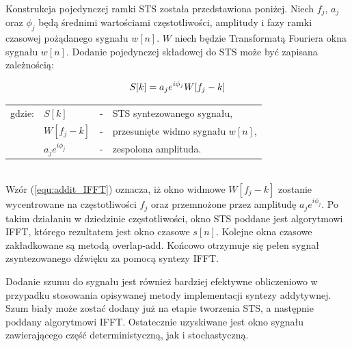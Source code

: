 Konstrukcja pojedynczej ramki STS została przedstawiona poniżej. Niech $f_{j}$, $a_{j}$ oraz $\phi_{j}$ będą średnimi wartościami częstotliwości, amplitudy i fazy ramki czasowej pożądanego sygnału $w[n]$. $W$ niech będzie Transformatą Fouriera okna sygnału $w[n]$. Dodanie pojedynczej składowej do STS może być zapisana zależnością:

\begin{equation} \label{equ:addit_IFFT}
S[k] = a_{j}e^{i\phi_{j}}W[f_{j} - k] \\  
\end{equation}
\begin{tabular}{ l l l l}
	gdzie: & $S[k]$ &  - & STS syntezowanego sygnału, \\
	& $W[f_{j} - k]$ &  - & przesunięte widmo sygnału $w[n]$, \\
	& $a_{j}e^{i\phi_{j}}$ & - & zespolona amplituda. \\
\end{tabular} \\

Wzór (\ref{equ:addit_IFFT}) oznacza, iż okno widmowe $W[f_{j} - k]$ zostanie wycentrowane na częstotliwości $f_{j}$ oraz przemnożone przez amplitudę $a_{j}e^{i\phi_{j}}$. Po takim działaniu w dziedzinie częstotliwości, okno STS poddane jest algorytmowi IFFT, którego rezultatem jest okno czasowe $s[n]$. Kolejne okna czasowe zakładkowane są metodą overlap-add. Końcowo otrzymuje się pełen sygnał zsyntezowanego dźwięku za pomocą syntezy IFFT.

Dodanie szumu do sygnału jest również bardziej efektywne obliczeniowo w przypadku stosowania opisywanej metody implementacji syntezy addytywnej. Szum biały może zostać dodany już na etapie tworzenia STS, a następnie poddany algorytmowi IFFT. Ostatecznie uzyskiwane jest okno sygnału zawierającego część deterministyczną, jak i stochastyczną.

